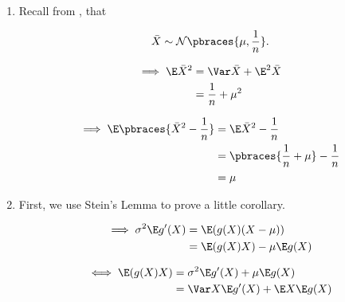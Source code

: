 \begin{solution}

\phantom{}

\begin{enumerate}[label = (\alph*)]

    \item Recall from \cite[lecture 4, slide 27]{EStat}, that

    \begin{align*}
        \bar X
        \sim
        \mathcal N \pbraces{\mu, \frac{1}{n}}.
    \end{align*}
    
    
    \begin{align*}
        \implies
        \E \bar X^2
        & =
        \Var \bar X + \E^2 \bar X \\
        & =
        \frac{1}{n} + \mu^2
    \end{align*}
    
    \begin{align*}
        \implies
        \E \pbraces{\bar X^2 - \frac{1}{n}}
        & =
        \E \bar X^2 - \frac{1}{n} \\
        & =
        \pbraces{\frac{1}{n} + \mu} - \frac{1}{n} \\
        & =
        \mu
    \end{align*}

    \item First, we use Stein's Lemma to prove a little corollary.
    
    \begin{align*}
        \implies
        \sigma^2 \E g^\prime(X)
        & =
        \E (g(X) (X - \mu)) \\
        & =
        \E (g(X) X) - \mu \E g(X)
    \end{align*}

    \begin{align*}
        \iff
        \E(g(X) X)
        & =
        \sigma^2 \E g^\prime(X) + \mu \E g(X) \\
        & =
        \Var X \E g^\prime(X) + \E X \E g(X)
    \end{align*}


\end{enumerate}
\end{solution}
